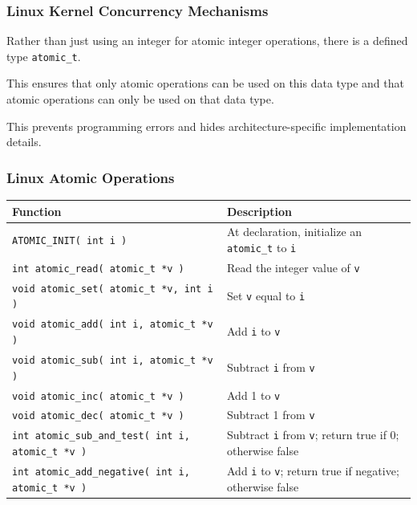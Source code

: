 \begin{frame}
\frametitle{Linux Kernel Concurrency Mechanisms}

Rather than just using an integer for atomic integer operations, there is a defined type \texttt{atomic\_t}. 

This ensures that only atomic operations can be used on this data type and that atomic operations can only be used on that data type. 

This prevents programming errors and hides architecture-specific implementation details.


\end{frame}

\begin{frame}
\frametitle{Linux Atomic Operations}

{\scriptsize
\begin{center}
\begin{tabular}{l|l}
	\textbf{Function} & \textbf{Description}\\\hline

	\texttt{ATOMIC\_INIT( int i )} & At declaration, initialize an \texttt{atomic\_t} to \texttt{i}\\\hline

\texttt{int atomic\_read( atomic\_t *v )} &  Read the integer value of \texttt{v}\\\hline

\texttt{void atomic\_set( atomic\_t *v, int i )} & Set \texttt{v} equal to \texttt{i}\\\hline

\texttt{void atomic\_add( int i, atomic\_t *v )} & Add \texttt{i} to \texttt{v}\\\hline

\texttt{void atomic\_sub( int i, atomic\_t *v )} & Subtract \texttt{i} from \texttt{v}\\\hline

\texttt{void atomic\_inc( atomic\_t *v )} & Add 1 to \texttt{v}\\\hline

\texttt{void atomic\_dec( atomic\_t *v )} & Subtract 1 from \texttt{v}\\\hline

\texttt{int atomic\_sub\_and\_test( int i, atomic\_t *v )} & Subtract \texttt{i} from \texttt{v}; return true if 0; otherwise false\\\hline

\texttt{int atomic\_add\_negative( int i, atomic\_t *v )} & Add \texttt{i} to \texttt{v}; return true if negative; otherwise false\\\hline


\end{tabular}
\end{center}}
\end{frame}

